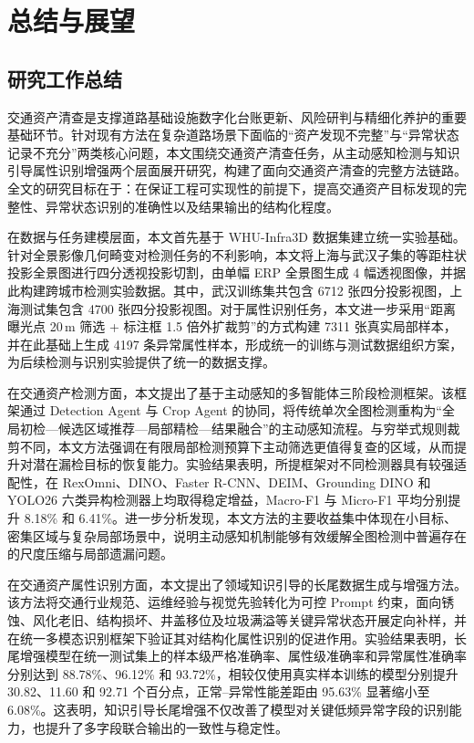 \chapter{总结与展望}

\section{研究工作总结}

交通资产清查是支撑道路基础设施数字化台账更新、风险研判与精细化养护的重要基础环节。针对现有方法在复杂道路场景下面临的“资产发现不完整”与“异常状态记录不充分”两类核心问题，本文围绕交通资产清查任务，从主动感知检测与知识引导属性识别增强两个层面展开研究，构建了面向交通资产清查的完整方法链路。全文的研究目标在于：在保证工程可实现性的前提下，提高交通资产目标发现的完整性、异常状态识别的准确性以及结果输出的结构化程度。

在数据与任务建模层面，本文首先基于 WHU-Infra3D 数据集建立统一实验基础。针对全景影像几何畸变对检测任务的不利影响，本文将上海与武汉子集的等距柱状投影全景图进行四分透视投影切割，由单幅 ERP 全景图生成 4 幅透视图像，并据此构建跨城市检测实验数据。其中，武汉训练集共包含 6712 张四分投影视图，上海测试集包含 4700 张四分投影视图。对于属性识别任务，本文进一步采用“距离曝光点 20\,m 筛选 + 标注框 1.5 倍外扩裁剪”的方式构建 7311 张真实局部样本，并在此基础上生成 4197 条异常属性样本，形成统一的训练与测试数据组织方案，为后续检测与识别实验提供了统一的数据支撑。

在交通资产检测方面，本文提出了基于主动感知的多智能体三阶段检测框架。该框架通过 Detection Agent 与 Crop Agent 的协同，将传统单次全图检测重构为“全局初检—候选区域推荐—局部精检—结果融合”的主动感知流程。与穷举式规则裁剪不同，本文方法强调在有限局部检测预算下主动筛选更值得复查的区域，从而提升对潜在漏检目标的恢复能力。实验结果表明，所提框架对不同检测器具有较强适配性，在 RexOmni、DINO、Faster R-CNN、DEIM、Grounding DINO 和 YOLO26 六类异构检测器上均取得稳定增益，Macro-F1 与 Micro-F1 平均分别提升 8.18\% 和 6.41\%。进一步分析发现，本文方法的主要收益集中体现在小目标、密集区域与复杂局部场景中，说明主动感知机制能够有效缓解全图检测中普遍存在的尺度压缩与局部遗漏问题。

在交通资产属性识别方面，本文提出了领域知识引导的长尾数据生成与增强方法。该方法将交通行业规范、运维经验与视觉先验转化为可控 Prompt 约束，面向锈蚀、风化老旧、结构损坏、井盖移位及垃圾满溢等关键异常状态开展定向补样，并在统一多模态识别框架下验证其对结构化属性识别的促进作用。实验结果表明，长尾增强模型在统一测试集上的样本级严格准确率、属性级准确率和异常属性准确率分别达到 88.78\%、96.12\% 和 93.72\%，相较仅使用真实样本训练的模型分别提升 30.82、11.60 和 92.71 个百分点，正常--异常性能差距由 95.63\% 显著缩小至 6.08\%。这表明，知识引导长尾增强不仅改善了模型对关键低频异常字段的识别能力，也提升了多字段联合输出的一致性与稳定性。

